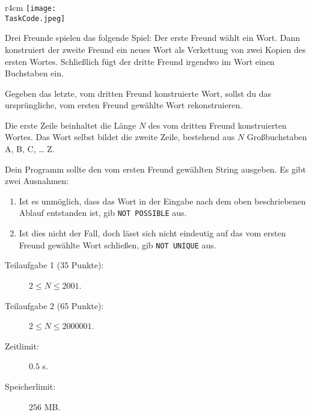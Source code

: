 \documentclass{boi2014-de}
\renewcommand{\TaskCode}{friends}
\begin{document}
    \begin{wrapfigure}{r}{4cm}
        \vspace{-24pt}
		\texttt{[image: \\TaskCode.jpeg]}
	\end{wrapfigure}
    Drei Freunde spielen das folgende Spiel:
    Der erste Freund wählt ein Wort.
    Dann konstruiert der zweite Freund ein neues Wort als Verkettung von zwei Kopien des ersten Wortes.
    Schließlich fügt der dritte Freund irgendwo im Wort einen Buchstaben ein.

    \Task
    Gegeben das letzte, vom dritten Freund konstruierte Wort, sollst du das ursprüngliche, vom ersten Freund gewählte Wort rekonstruieren.

    \Input
    Die erste Zeile beinhaltet die Länge $N$ des vom dritten Freund konstruierten Wortes.
    Das Wort selbst bildet die zweite Zeile, bestehend aus $N$ Großbuchstaben A, B, C, \ldots{} Z.

    \Output
    Dein Programm sollte den vom ersten Freund gewählten String ausgeben.
    Es gibt zwei Ausnahmen:
    \begin{enumerate}
        \item Ist es unmöglich, dass das Wort in der Eingabe nach dem oben beschriebenen Ablauf entstanden ist, gib {\tt NOT POSSIBLE} aus.
        \item Ist dies nicht der Fall, doch lässt sich nicht eindeutig auf das vom ersten Freund gewählte Wort schließen, gib {\tt NOT
        UNIQUE} aus.
    \end{enumerate}
    

    \Examples


    \Scoring

    \begin{description}
        \item[Teilaufgabe 1 (35 Punkte):] $2 \le N \le 2001$.
        \item[Teilaufgabe 2 (65 Punkte):] $2 \le N \le 2000001$.
    \end{description}

    \Constraints

    \begin{description}
        \item[Zeitlimit:] $0.5$ s.
        \item[Speicherlimit:] $256$ MB.
    \end{description}
\end{document}
